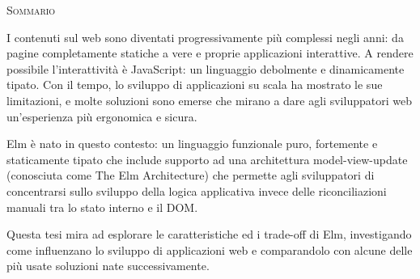 \begin{center}
  \textsc{Sommario}
\end{center}
\noindent

I contenuti sul web sono diventati progressivamente più complessi negli anni: da pagine completamente statiche a vere e proprie applicazioni interattive. A rendere possibile l'interattività è JavaScript: un linguaggio debolmente e dinamicamente tipato. Con il tempo, lo sviluppo di applicazioni su scala ha mostrato le sue limitazioni, e molte soluzioni sono emerse che mirano a dare agli sviluppatori web un'esperienza più ergonomica e sicura.

Elm è nato in questo contesto: un linguaggio funzionale puro, fortemente e staticamente tipato che include supporto ad una architettura model-view-update (conosciuta come The Elm Architecture) che permette agli sviluppatori di concentrarsi sullo sviluppo della logica applicativa invece delle riconciliazioni manuali tra lo stato interno e il DOM.

Questa tesi mira ad esplorare le caratteristiche ed i trade-off di Elm, investigando come influenzano lo sviluppo di applicazioni web e comparandolo con alcune delle più usate soluzioni nate successivamente.
